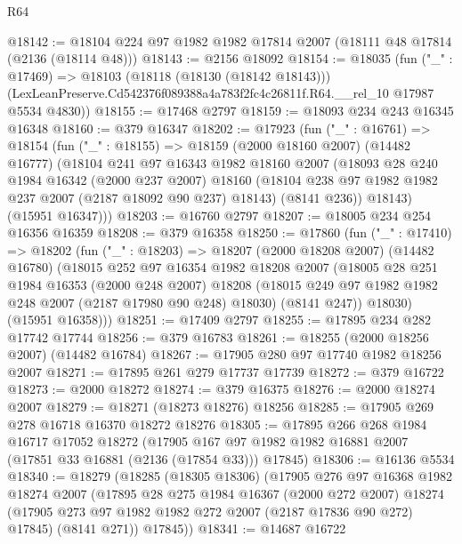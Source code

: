 \begin{lexlean}{R64}
\begin{coremodule}
@18142 := @18104 @224 @97 @1982 @1982 @17814 @2007 (@18111 @48 @17814 (@2136 (@18114 @48)))
@18143 := @2156 @18092
@18154 := @18035
    (fun ("_" : @17469) =>
    @18103
      (@18118 (@18130 (@18142 @18143)))
      (LexLeanPreserve.Cd542376f089388a4a783f2fc4c26811f.R64.__rel_10 @17987 @5534 @4830))
@18155 := @17468 @2797
@18159 := @18093 @234 @243 @16345 @16348
@18160 := @379 @16347
@18202 := @17923
    (fun ("_" : @16761) =>
    @18154
      (fun ("_" : @18155) =>
      @18159
        (@2000 @18160 @2007)
        (@14482 @16777)
        (@18104
          @241
          @97
          @16343
          @1982
          @18160
          @2007
          (@18093
            @28
            @240
            @1984
            @16342
            (@2000 @237 @2007)
            @18160
            (@18104 @238 @97 @1982 @1982 @237 @2007 (@2187 @18092 @90 @237) @18143)
            (@8141 @236))
          @18143)
        (@15951 @16347)))
@18203 := @16760 @2797
@18207 := @18005 @234 @254 @16356 @16359
@18208 := @379 @16358
@18250 := @17860
    (fun ("_" : @17410) =>
    @18202
      (fun ("_" : @18203) =>
      @18207
        (@2000 @18208 @2007)
        (@14482 @16780)
        (@18015
          @252
          @97
          @16354
          @1982
          @18208
          @2007
          (@18005
            @28
            @251
            @1984
            @16353
            (@2000 @248 @2007)
            @18208
            (@18015 @249 @97 @1982 @1982 @248 @2007 (@2187 @17980 @90 @248) @18030)
            (@8141 @247))
          @18030)
        (@15951 @16358)))
@18251 := @17409 @2797
@18255 := @17895 @234 @282 @17742 @17744
@18256 := @379 @16783
@18261 := @18255 (@2000 @18256 @2007) (@14482 @16784)
@18267 := @17905 @280 @97 @17740 @1982 @18256 @2007
@18271 := @17895 @261 @279 @17737 @17739
@18272 := @379 @16722
@18273 := @2000 @18272
@18274 := @379 @16375
@18276 := @2000 @18274 @2007
@18279 := @18271 (@18273 @18276) @18256
@18285 := @17905 @269 @278 @16718 @16370 @18272 @18276
@18305 := @17895
    @266
    @268
    @1984
    @16717
    @17052
    @18272
    (@17905 @167 @97 @1982 @1982 @16881 @2007 (@17851 @33 @16881 (@2136 (@17854 @33))) @17845)
@18306 := @16136 @5534
@18340 := @18279
    (@18285
      (@18305 @18306)
      (@17905
        @276
        @97
        @16368
        @1982
        @18274
        @2007
        (@17895
          @28
          @275
          @1984
          @16367
          (@2000 @272 @2007)
          @18274
          (@17905 @273 @97 @1982 @1982 @272 @2007 (@2187 @17836 @90 @272) @17845)
          (@8141 @271))
        @17845))
@18341 := @14687 @16722

\end{coremodule}
\end{lexlean}
